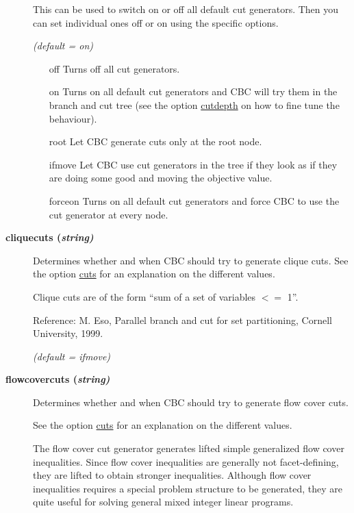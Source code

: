 \begin{description}
This can be used to switch on or off all default cut generators.
Then you can set individual ones off or on using the specific options.

\textsl{(default = on)}
\begin{itemize}
\item[off] 
Turns off all cut generators.
\item[on] 
Turns on all default cut generators and CBC will try them in the branch and cut tree (see the option \hyperlink{cutdepth}{cutdepth} on how to fine tune the behaviour).
\item[root] 
Let CBC generate cuts only at the root node.
\item[ifmove] 
Let CBC use cut generators in the tree if they look as if they are doing some good and moving the objective value.
\item[forceon] 
Turns on all default cut generators and force CBC to use the cut generator at every node.
\end{itemize}

\item[\label{cliquecuts}\hypertarget{cliquecuts}
{\textbf{cliquecuts (\slshape{string})}}]\hspace{1.0in}

Determines whether and when CBC should try to generate clique cuts.
See the option \hyperlink{cuts}{cuts} for an explanation on the different values.

Clique cuts are of the form ``sum of a set of variables $<=$ 1''.

Reference: M. Eso, Parallel branch and cut for set partitioning, Cornell University, 1999.

\textsl{(default = ifmove)}

\item[\label{flowcovercuts}\hypertarget{flowcovercuts}
{\textbf{flowcovercuts (\slshape{string})}}]\hspace{1.0in}

Determines whether and when CBC should try to generate flow cover cuts.

See the option \hyperlink{cuts}{cuts} for an explanation on the different values.

The flow cover cut generator generates lifted simple generalized flow cover inequalities.
Since flow cover inequalities are generally not facet-defining, they are lifted to obtain stronger inequalities.
Although flow cover inequalities requires a special problem structure to be generated, they are quite useful for solving general mixed integer linear programs.


\end{description}
